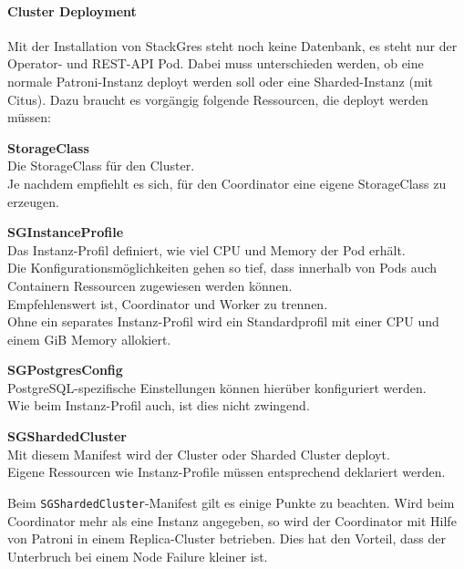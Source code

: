\clearpage
\begin{flushleft}
    \paragraph{Cluster Deployment}
    Mit der Installation von StackGres steht noch keine Datenbank, es steht nur der Operator- und REST-API Pod.
    Dabei muss unterschieden werden, ob eine normale Patroni-Instanz deployt werden soll oder eine Sharded-Instanz (mit Citus).
    Dazu braucht es vorgängig folgende Ressourcen, die deployt werden müssen:
    \begin{description}
        \item \textbf{StorageClass}\hfill \\Die StorageClass für den Cluster.\\Je nachdem empfiehlt es sich, für den Coordinator eine eigene StorageClass zu erzeugen.
        \item \textbf{SGInstanceProfile}\hfill \\Das Instanz-Profil definiert, wie viel CPU und Memory der Pod erhält.\\Die Konfigurationsmöglichkeiten gehen so tief, dass innerhalb von Pods auch Containern Ressourcen zugewiesen werden können.\\Empfehlenswert ist, Coordinator und Worker zu trennen.\\Ohne ein separates Instanz-Profil wird ein Standardprofil mit einer CPU und einem GiB Memory allokiert.
        \item \textbf{SGPostgresConfig}\hfill \\PostgreSQL-spezifische Einstellungen können hierüber konfiguriert werden.\\Wie beim Instanz-Profil auch, ist dies nicht zwingend.
        \item \textbf{SGShardedCluster}\hfill \\Mit diesem Manifest wird der Cluster oder Sharded Cluster deployt.\\Eigene Ressourcen wie Instanz-Profile müssen entsprechend deklariert werden.
    \end{description}
\end{flushleft}
\begin{flushleft}
    Beim \texttt{SGShardedCluster}-Manifest gilt es einige Punkte zu beachten.
    Wird beim Coordinator mehr als eine Instanz angegeben, so wird der Coordinator mit Hilfe von Patroni in einem Replica-Cluster betrieben.
    Dies hat den Vorteil, dass der Unterbruch bei einem Node Failure kleiner ist.
\end{flushleft}
